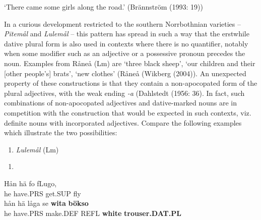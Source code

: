 ‘There came some girls along the road.’ (Brännström (1993: 19)) 
\z

In a curious development restricted to the southern Norrbothnian varieties –  \textit{Pitemål} and \textit{Lulemål} – this pattern has spread in such a way that the erstwhile dative plural form is also used in contexts where there is no quantifier, notably when some modifier such as an adjective or a possessive pronoun precedes the noun. Examples from Råneå (Lm) are  ‘three black sheep’,  ‘our children and their [other people’s] brats’,  ‘new clothes’ (Råneå (Wikberg (2004)). An unexpected property of these constructions is that they contain a non-apocopated form of the plural adjectives, with the weak ending\textit{ {}-a }(Dahlstedt (1956: 36). In fact, such combinations of non-apocopated adjectives and dative-marked nouns are in competition with the construction that would be expected in such contexts, viz. definite nouns with incorporated adjectives. Compare the following examples which illustrate the two possibilities:

\begin{enumerate} %
\item 
\textit{Lulemål} (Lm)
\end{enumerate} %
\setcounter{listLFOxcviiileveli}{0}
\begin{enumerate} %
\item 
\end{enumerate} %
\ea\label{}
\gll Hån  hä  fo  fLugo,\\


he  have.PRS  get.SUP  fly\\ %


\ea\label{}
\gll hån  hä  låga  se  \textbf{wita} \textbf{bökso}\\


he  have.PRS  make.DEF  REFL  \textbf{white} \textbf{trouser.DAT.PL}\\ %


